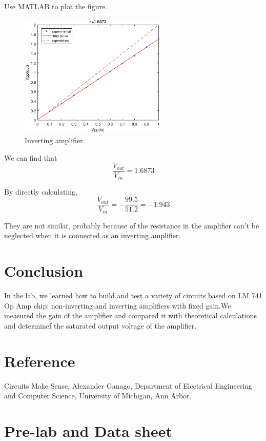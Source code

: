 \documentclass{article}
\begin{document}
Use MATLAB to plot the figure.
\begin{figure}[h!]
    \centering
    \includegraphics[width=7cm]{2.eps}
    \caption{Inverting amplifier.}
    \label{fig-1}
\end{figure}

We can find that 
$$\frac{V_{out}}{V_{in}}=1.6873$$

By directly calculating,
$$\frac{V_{out}}{V_{in}}=-\frac{99.5}{51.2}=-1.943$$

They are not similar, probably because of the resistance in the amplifier can't be neglected when it is connected as an inverting amplifier.

\section{Conclusion}
In the lab, we learned how to build and test a variety of circuits based on LM 741 Op Amp chip: non-inverting and inverting amplifiers with fixed gain.We measured the gain of the amplifier and compared it with theoretical calculations and determinef the saturated output voltage of the amplifier.

\section{Reference}
Circuits Make Sense, Alexander Ganago, Department of Electrical Engineering and Computer Science, University of Michigan, Ann Arbor.

\section{Pre-lab and Data sheet}
\end{document}
